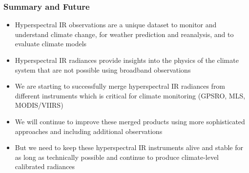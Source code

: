 \documentclass[10pt,t]{beamer}
\begin{document}
\begin{frame}
\frametitle{Summary and Future}  
\begin{itemize}

\item Hyperspectral IR observations are a unique dataset to monitor
  and understand climate change, for weather prediction and
  reanalysis, and to evaluate climate models

\item Hyperspectral IR radiances provide insights into the physics of
  the climate system that are not possible using broadband
  observations

\item We are starting to successfully merge hyperspectral IR radiances
  from different instruments which is critical for climate monitoring
  (GPSRO, MLS, MODIS/VIIRS)

\item We will continue to improve these merged products using more
  sophisticated approaches and including additional observations

\item But we need to keep these hyperspectral IR instruments alive and
  stable for as long as technically possible and continue to produce
  climate-level calibrated radiances

\end{itemize}
\end{frame}
\end{document}
